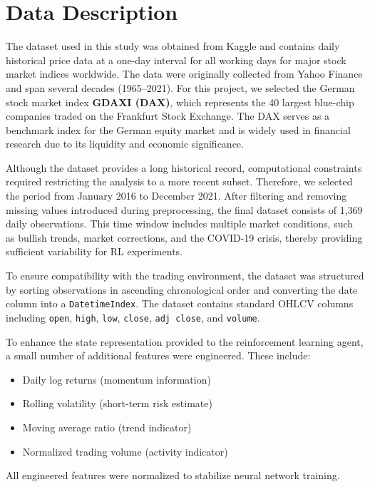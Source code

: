 \section{Data Description}

The dataset used in this study was obtained from Kaggle \citep{kaggle2024} and contains daily historical price data at a one-day interval for all working days for major stock market indices worldwide. The data were originally collected from Yahoo Finance and span several decades (1965–2021). For this project, we selected the German stock market index \textbf{GDAXI (DAX)}, which represents the 40 largest blue-chip companies traded on the Frankfurt Stock Exchange. The DAX serves as a benchmark index for the German equity market and is widely used in financial research due to its liquidity and economic significance.

Although the dataset provides a long historical record, computational constraints required restricting the analysis to a more recent subset. Therefore, we selected the period from January 2016 to December 2021. After filtering and removing missing values introduced during preprocessing, the final dataset consists of 1,369 daily observations. This time window includes multiple market conditions, such as bullish trends, market corrections, and the COVID-19 crisis, thereby providing sufficient variability for RL experiments.

To ensure compatibility with the trading environment, the dataset was structured by sorting observations in ascending chronological order and converting the date column into a \texttt{DatetimeIndex}. The dataset contains standard OHLCV columns including \texttt{open}, \texttt{high}, \texttt{low}, \texttt{close}, \texttt{adj close}, and \texttt{volume}.

To enhance the state representation provided to the reinforcement learning agent, a small number of additional features were engineered. These include:

\begin{itemize}
    \item Daily log returns (momentum information)
    \item Rolling volatility (short-term risk estimate)
    \item Moving average ratio (trend indicator)
    \item Normalized trading volume (activity indicator)
\end{itemize}

All engineered features were normalized to stabilize neural network training.
